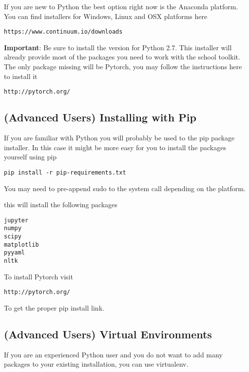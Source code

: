 If you are new to Python the best option right now is the Anaconda platform. You can find installers for Windows, Linux and OSX platforms here

\begin{verbatim}
https://www.continuum.io/downloads
\end{verbatim}

\textbf{Important}: Be sure to install the version for Python 2.7. This installer will already provide most of the packages you need to work with the school toolkit. The only package missing will be Pytorch, you may follow the instructions here to install it

\begin{verbatim}
http://pytorch.org/
\end{verbatim}

\subsection{(Advanced Users) Installing with Pip}

If you are familiar with Python you will probably be used to the pip package installer. In this case it might be more easy for you to install the packages yourself using pip

\begin{verbatim}
pip install -r pip-requirements.txt 
\end{verbatim}

You may need to pre-append sudo to the system call depending on the platform.

\noindent this will install the following packages

\begin{verbatim}
jupyter
numpy
scipy
matplotlib
pyyaml
nltk
\end{verbatim}

\noindent To install Pytorch visit 

\begin{verbatim}
http://pytorch.org/
\end{verbatim}

\noindent To get the proper pip install link.

\subsection{(Advanced Users) Virtual Environments}

If you are an experienced Python user and you do not want to add many packages to your existing installation, you can use virtualenv.

